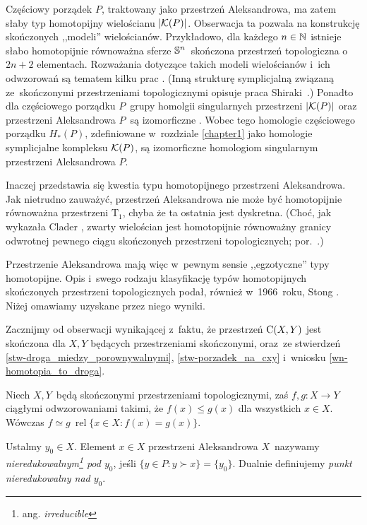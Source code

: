Częściowy porządek $P$, traktowany jako przestrzeń Aleksandrowa, ma zatem słaby typ homotopijny wielościanu $|\mK(P)|$. Obserwacja ta pozwala na konstrukcję skończonych ,,modeli'' wielościanów. Przykładowo, dla każdego $n\in\mN$ istnieje słabo homotopijnie równoważna sferze $\S^n$~skończona przestrzeń topologiczna o~$2n+2$ elementach. Rozważania dotyczące takich modeli wielościanów i~ich odwzorowań są tematem kilku prac \cite{Adamaszek13,Barmak07,Hardie93,Hardie02,Hardie03,Hardie06,Hardie07,Weng10}. (Inną strukturę symplicjalną związaną ze~skończonymi przestrzeniami topologicznymi opisuje praca Shiraki~\cite{Shiraki69}.) Ponadto dla częściowego porządku $P$~grupy homolgii singularnych przestrzeni $|\mK(P)|$ oraz przestrzeni Aleksandrowa $P$~są izomorficzne \cite{McCord66}. Wobec tego homologie częściowego porządku $H_*(P)$, zdefiniowane w~rozdziale \ref{chapter1} jako homologie symplicjalne kompleksu $\mK(P)$, są izomorficzne homologiom singularnym przestrzeni Aleksandrowa $P$.

Inaczej przedstawia się kwestia typu homotopijnego przestrzeni Aleksandrowa. Jak nietrudno zauważyć, przestrzeń Aleksandrowa nie może być homotopijnie równoważna przestrzeni $\mathrm{T_1}$, chyba że ta ostatnia jest dyskretna. (Choć, jak wykazała Clader \cite{Clader09}, zwarty wielościan jest homotopijnie równoważny granicy odwrotnej pewnego ciągu skończonych przestrzeni topologicznych; por.~\cite{Wofsey08}.)

Przestrzenie Aleksandrowa mają więc w~pewnym sensie ,,egzotyczne'' typy homotopijne. Opis i~swego rodzaju klasyfikację typów homotopijnych skończonych przestrzeni topologicznych podał, również w~1966~roku, Stong \cite{Stong66}. Niżej omawiamy uzyskane przez niego wyniki.

Zacznijmy od obserwacji wynikającej z~faktu, że  przestrzeń $\Cont(X,Y)$ jest skończona dla $X,Y$ będących przestrzeniami skończonymi, oraz~ze stwierdzeń \ref{stw-droga_miedzy_porownywalnymi}, \ref{stw-porzadek_na_cxy} i~wniosku \ref{wn-homotopia_to_droga}.

\begin{stw}\label{stw-porownywalne_sa_homotopijne}
Niech $X,Y$~będą skończonymi przestrzeniami topologicznymi, zaś $f,g\colon X\to Y$ ciągłymi odwzorowaniami takimi, że $f(x)\leq g(x)$ dla wszystkich $x\in X$. Wówczas $f\simeq g\ \operatorname{rel} \{x\in X:f(x)=g(x)\}$. 
\end{stw}

Ustalmy $y_0\in X$. Element $x\in X$ przestrzeni Aleksandrowa $X$~nazywamy \textit{nieredukowalnym\footnote{ang. \textit{irreducible}} pod $y_0$}, jeśli $\{y\in P:y\succ x\}=\{y_0\}$. Dualnie definiujemy \textit{punkt nieredukowalny nad $y_0$}. 

